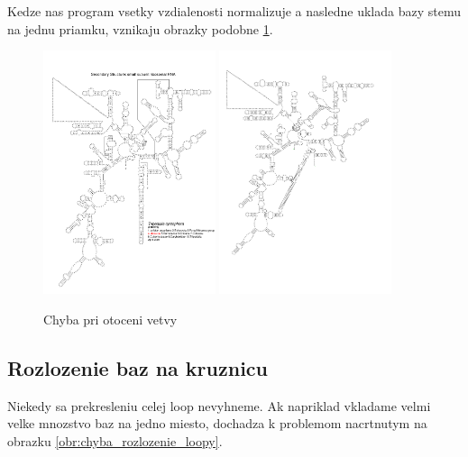 Kedze nas program vsetky vzdialenosti normalizuje a nasledne uklada bazy stemu na jednu priamku,
vznikaju obrazky podobne \ref{obr:chyba_otocenie_vetvy}.

\begin{figure}
  \includegraphics[width=0.45\textwidth]{../img/chyby/tripedalia_cystophora}
  \includegraphics[width=0.45\textwidth]{../img/chyby/tripedalia_cystophora-tripedalia_cystophora}
  \caption{Chyba pri otoceni vetvy}
  \label{obr:chyba_otocenie_vetvy}
\end{figure}

\subsection{Rozlozenie baz na kruznicu}

Niekedy sa prekresleniu celej loop nevyhneme. Ak napriklad vkladame velmi velke mnozstvo baz na jedno
miesto, dochadza k problemom nacrtnutym na obrazku \ref{obr:chyba_rozlozenie_loopy}.

